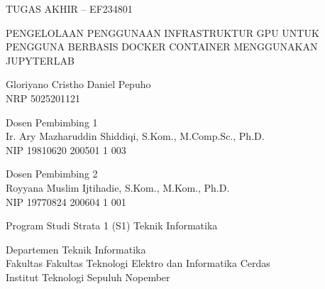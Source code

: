 \begin{large}
TUGAS AKHIR – EF234801
\end{large}

\vspace{\fill}

\begin{spacing}{1.5}
  \begin{Large}
    PENGELOLAAN PENGGUNAAN INFRASTRUKTUR GPU 
    UNTUK PENGGUNA BERBASIS DOCKER CONTAINER MENGGUNAKAN JUPYTERLAB
  \end{Large}
\end{spacing}

\vspace{\fill}

\begin{large}
  Gloriyano Cristho Daniel Pepuho \\
  \textmd{NRP 5025201121}
\end{large}

\vspace{\fill}

\begin{large}
  \textmd{Dosen Pembimbing 1} \\
  Ir. Ary Mazharuddin Shiddiqi, S.Kom., M.Comp.Sc., Ph.D. \\
  \textmd{NIP 19810620 200501 1 003} \\
  \end{large}
  
\vspace{\fill}

  \begin{large}
  \textmd{Dosen Pembimbing 2} \\
  Royyana Muslim Ijtihadie, S.Kom., M.Kom., Ph.D. \\
  \textmd{NIP  19770824 200604 1 001}
\end{large}

\vspace{\fill}

Program Studi Strata 1 (S1) Teknik Informatika \\

\mdseries

Departemen Teknik Informatika \\
Fakultas Fakultas Teknologi Elektro dan Informatika Cerdas \\
Institut Teknologi Sepuluh Nopember

\place{} \\ \the\year{}
